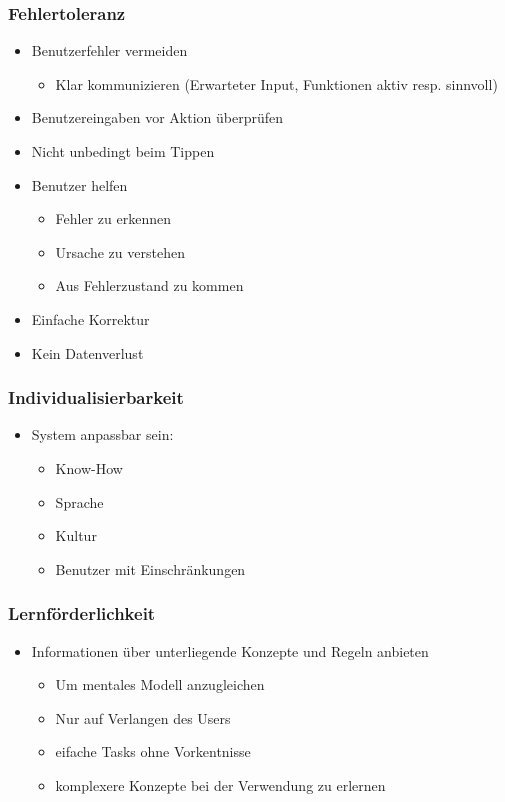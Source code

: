 \documentclass{article}
\begin{document}
\subsubsection{Fehlertoleranz}
\begin{itemize}
	\item Benutzerfehler vermeiden
	\begin{itemize}
		\item Klar kommunizieren (Erwarteter Input, Funktionen aktiv resp. sinnvoll)
	\end{itemize}
	\item Benutzereingaben vor Aktion überprüfen
	\item Nicht unbedingt beim Tippen
	\item Benutzer helfen
	\begin{itemize}
		\item Fehler zu erkennen
		\item Ursache zu verstehen
		\item Aus Fehlerzustand zu kommen
	\end{itemize}
	\item Einfache Korrektur
	\item Kein Datenverlust
\end{itemize}

\subsubsection{Individualisierbarkeit}
\begin{itemize}
	\item System anpassbar sein:
	\begin{itemize}
		\item Know-How
		\item Sprache
		\item Kultur
		\item Benutzer mit Einschränkungen
	\end{itemize}	
\end{itemize}

\subsubsection{Lernförderlichkeit}
\begin{itemize}
	\item Informationen über unterliegende Konzepte und Regeln anbieten
	\begin{itemize}
		\item Um mentales Modell anzugleichen
		\item Nur auf Verlangen des Users
		\item eifache Tasks ohne Vorkentnisse
		\item komplexere Konzepte bei der Verwendung zu erlernen
	\end{itemize}
\end{itemize}
\end{document}
